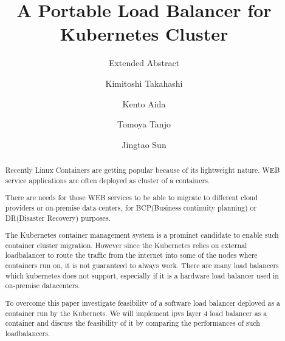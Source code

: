 \documentclass[sigconf]{acmart}
\begin{document}
\title{A Portable Load Balancer for Kubernetes Cluster}
\subtitle{Extended Abstract}


\author{Kimitoshi Takahashi}

\author{Kento Aida}

\author{Tomoya Tanjo}

\author{Jingtao Sun}

\renewcommand{\shortauthors}{B. Trovato et al.}


\begin{abstract}
Recently Linux Containers are getting popular because of its lightweight nature.
WEB service applications are often deployed as cluster of a containers.

There are needs for those WEB services to be able to migrate to different cloud providers
or on-premise data centers, for BCP(Business continuity planning) or DR(Disaster Recovery) purposes.

The Kubernetes container management system is a prominet candidate to enable such container cluster migration.
However since the Kubernetes relies on external loadbalancer to route the traffic from the internet into some of the nodes where containers run on, 
it is not guaranteed to always work.
There are many load balancers which kubernetes does not support, 
especially if it is a hardware load balancer used in on-premise datacenters.

To overcome this paper investigate feasibility of a software load balancer deployed as a container run by the Kubernets. 
We will implement ipvs layer 4 load balancer as a container and discuss the feasibility of it by comparing the performances of such loadbalancers.

\end{abstract}
\end{document}
